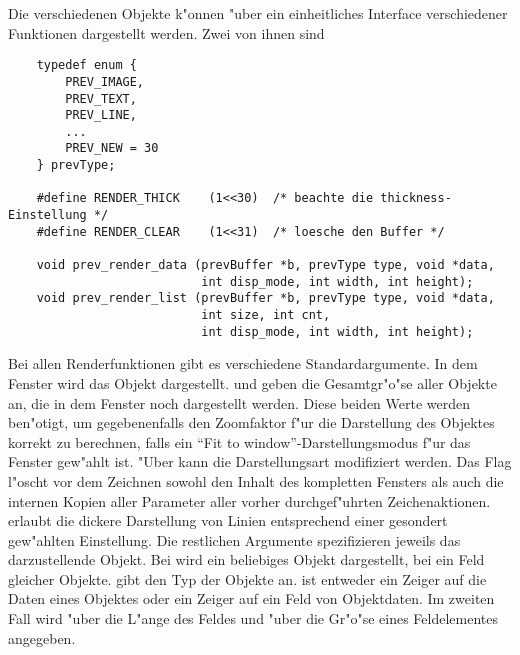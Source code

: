Die verschiedenen Objekte k"onnen "uber ein einheitliches Interface
verschiedener Funktionen dargestellt werden. Zwei von ihnen sind
\begin{small}
\linespread{0.9}
\begin{verbatim}
    typedef enum {
        PREV_IMAGE,
        PREV_TEXT,
        PREV_LINE,
        ...
        PREV_NEW = 30
    } prevType;

    #define RENDER_THICK    (1<<30)  /* beachte die thickness-Einstellung */
    #define RENDER_CLEAR    (1<<31)  /* loesche den Buffer */

    void prev_render_data (prevBuffer *b, prevType type, void *data,
                           int disp_mode, int width, int height);
    void prev_render_list (prevBuffer *b, prevType type, void *data,
                           int size, int cnt,
                           int disp_mode, int width, int height);
\end{verbatim}
\end{small}
Bei allen Renderfunktionen gibt es verschiedene
Standardargumente. In dem Fenster  wird das Objekt
dargestellt.  und  geben die Gesamtgr"o"se
aller Objekte an, die in dem Fenster noch dargestellt werden. Diese
beiden Werte werden ben"otigt, um gegebenenfalls den Zoomfaktor f"ur
die Darstellung des Objektes korrekt zu berechnen, falls ein ``Fit
to window''-Darstellungsmodus f"ur das Fenster gew"ahlt ist. "Uber
 kann die Darstellungsart modifiziert werden. Das
Flag  l"oscht vor dem Zeichnen sowohl den Inhalt
des kompletten Fensters als auch die internen Kopien aller Parameter
aller vorher durchgef"uhrten Zeichenaktionen. 
erlaubt die dickere Darstellung von Linien entsprechend einer
gesondert gew"ahlten Einstellung. Die restlichen Argumente
spezifizieren jeweils das darzustellende Objekt. Bei
 wird ein beliebiges Objekt dargestellt,
bei  ein Feld gleicher Objekte. 
gibt den Typ der Objekte an.  ist entweder ein Zeiger auf
die Daten eines Objektes oder ein Zeiger auf ein Feld von
Objektdaten. Im zweiten Fall wird "uber  die L"ange des
Feldes und "uber  die Gr"o"se eines Feldelementes
angegeben.

